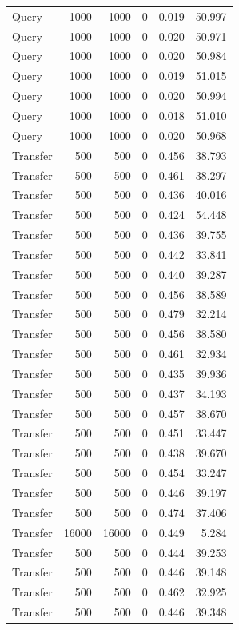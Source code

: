 \begin{table}
\begin{tabular}{lrrrrr}
Query & 1000 & 1000 & 0 & 0.019 & 50.997 \\
Query & 1000 & 1000 & 0 & 0.020 & 50.971 \\
Query & 1000 & 1000 & 0 & 0.020 & 50.984 \\
Query & 1000 & 1000 & 0 & 0.019 & 51.015 \\
Query & 1000 & 1000 & 0 & 0.020 & 50.994 \\
Query & 1000 & 1000 & 0 & 0.018 & 51.010 \\
Query & 1000 & 1000 & 0 & 0.020 & 50.968 \\
Transfer & 500 & 500 & 0 & 0.456 & 38.793 \\
Transfer & 500 & 500 & 0 & 0.461 & 38.297 \\
Transfer & 500 & 500 & 0 & 0.436 & 40.016 \\
Transfer & 500 & 500 & 0 & 0.424 & 54.448 \\
Transfer & 500 & 500 & 0 & 0.436 & 39.755 \\
Transfer & 500 & 500 & 0 & 0.442 & 33.841 \\
Transfer & 500 & 500 & 0 & 0.440 & 39.287 \\
Transfer & 500 & 500 & 0 & 0.456 & 38.589 \\
Transfer & 500 & 500 & 0 & 0.479 & 32.214 \\
Transfer & 500 & 500 & 0 & 0.456 & 38.580 \\
Transfer & 500 & 500 & 0 & 0.461 & 32.934 \\
Transfer & 500 & 500 & 0 & 0.435 & 39.936 \\
Transfer & 500 & 500 & 0 & 0.437 & 34.193 \\
Transfer & 500 & 500 & 0 & 0.457 & 38.670 \\
Transfer & 500 & 500 & 0 & 0.451 & 33.447 \\
Transfer & 500 & 500 & 0 & 0.438 & 39.670 \\
Transfer & 500 & 500 & 0 & 0.454 & 33.247 \\
Transfer & 500 & 500 & 0 & 0.446 & 39.197 \\
Transfer & 500 & 500 & 0 & 0.474 & 37.406 \\
Transfer & 16000 & 16000 & 0 & 0.449 & 5.284 \\
Transfer & 500 & 500 & 0 & 0.444 & 39.253 \\
Transfer & 500 & 500 & 0 & 0.446 & 39.148 \\
Transfer & 500 & 500 & 0 & 0.462 & 32.925 \\
Transfer & 500 & 500 & 0 & 0.446 & 39.348 \\

\end{tabular}
\end{table}
